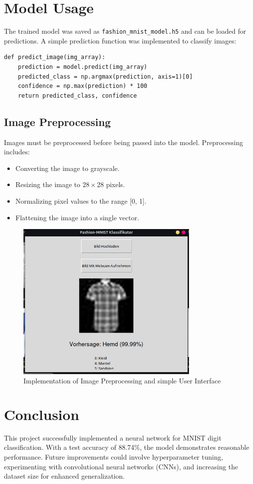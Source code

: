 \documentclass[12pt,a4paper]{article}
\begin{document}
\section*{Model Usage}
The trained model was saved as \texttt{fashion\_mnist\_model.h5} and can be loaded for predictions. A simple prediction function was implemented to classify images:
\begin{lstlisting}
def predict_image(img_array):
    prediction = model.predict(img_array)
    predicted_class = np.argmax(prediction, axis=1)[0]
    confidence = np.max(prediction) * 100
    return predicted_class, confidence
\end{lstlisting}

\subsection*{Image Preprocessing}
Images must be preprocessed before being passed into the model. Preprocessing includes:
\begin{itemize}
    \item Converting the image to grayscale.
    \item Resizing the image to $28 \times 28$ pixels.
    \item Normalizing pixel values to the range [0, 1].
    \item Flattening the image into a single vector.
\end{itemize}


\begin{figure}[h!]
    \centering
    \includegraphics[width=0.8\textwidth]{image-3.png}
    \caption{Implementation of Image Preprocessing and simple User Interface}
    \label{fig:training-curves}
\end{figure}

\section*{Conclusion}
This project successfully implemented a neural network for MNIST digit classification. With a test accuracy of 88.74\%, the model demonstrates reasonable performance. Future improvements could involve hyperparameter tuning, experimenting with convolutional neural networks (CNNs), and increasing the dataset size for enhanced generalization.
\end{document}
